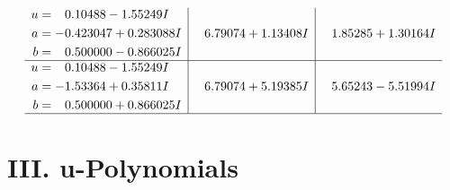\documentclass[1p]{elsarticle_modified}
\theoremstyle{definition}
\begin{document}
$$\begin{array}{c|c|c}
\begin{aligned}
u &= \phantom{-}0.10488 - 1.55249 I \\
a &= -0.423047 + 0.283088 I \\
b &= \phantom{-}0.500000 - 0.866025 I\end{aligned}
 & \phantom{-}6.79074 + 1.13408 I & \phantom{-}1.85285 + 1.30164 I \\ \hline\begin{aligned}
u &= \phantom{-}0.10488 - 1.55249 I \\
a &= -1.53364 + 0.35811 I \\
b &= \phantom{-}0.500000 + 0.866025 I\end{aligned}
 & \phantom{-}6.79074 + 5.19385 I & \phantom{-}5.65243 - 5.51994 I\\
 \hline 
 \end{array}$$\newpage
\newpage\renewcommand{\arraystretch}{1}
\centering \section*{ III. u-Polynomials}
\end{document}
